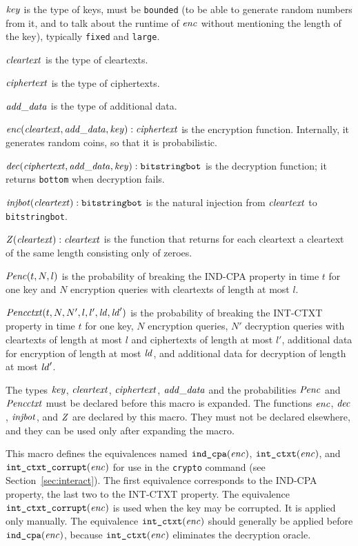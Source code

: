 \documentclass{article}
\begin{document}
\begin{itemize}
   $\mathit{key}$ is the type of keys, must be \texttt{bounded} (to be able to generate random numbers from it, and to talk about the runtime of $\mathit{enc}$ without mentioning the length of the key), typically \texttt{fixed} and \texttt{large}.

   $\mathit{cleartext}$ is the type of cleartexts.

   $\mathit{ciphertext}$ is the type of ciphertexts.

   $\mathit{add\_data}$ is the type of additional data.

   $\mathit{enc}(\mathit{cleartext}, \mathit{add\_data}, \mathit{key}): \mathit{ciphertext}$ is the encryption function. Internally, it generates random coins, so that it is probabilistic.

   $\mathit{dec}(\mathit{ciphertext}, \mathit{add\_data}, \mathit{key}): \texttt{bitstringbot}$ is the
  decryption function; it returns \texttt{bottom} when decryption
  fails.

   $\mathit{injbot}(\mathit{cleartext}): \texttt{bitstringbot}$ is the natural
  injection from $\mathit{cleartext}$ to \texttt{bitstringbot}.

   $\mathit{Z}(\mathit{cleartext}): \mathit{cleartext}$ is the function that
  returns for each cleartext a cleartext of the same length consisting
  only of zeroes.

  $\mathit{Penc}(t, N, l)$ is the probability of breaking the IND-CPA
  property in time $t$ for one key and $N$ encryption queries with
  cleartexts of length at most $l$.

  $\mathit{Pencctxt}(t, N, N', l, l', \mathit{ld}, \mathit{ld}')$ is the probability of
  breaking the INT-CTXT property in time $t$ for one key, $N$
  encryption queries, $N'$ decryption queries with cleartexts of
  length at most $l$ and ciphertexts of length at most $l'$,
  additional data for encryption of length at most $\mathit{ld}$, and
  additional data for decryption of length at most $\mathit{ld}'$.

   The types $\mathit{key}$, $\mathit{cleartext}$,
   $\mathit{ciphertext}$, $\mathit{add\_data}$ and the probabilities $\mathit{Penc}$ and $\mathit{Pencctxt}$ must
   be declared before this macro is expanded. The functions
   $\mathit{enc}$, $\mathit{dec}$, $\mathit{injbot}$, and $\mathit{Z}$ are declared by this
   macro. They must not be declared elsewhere, and they can be used
   only after expanding the macro.

   This macro defines the equivalences named $\texttt{ind\_cpa}(\mathit{enc})$,
   $\texttt{int\_ctxt}(\mathit{enc})$, and $\texttt{int\_ctxt\_corrupt}(\mathit{enc})$ 
   for use in the \texttt{crypto} command 
   (see Section~\ref{sec:interact}). 
   The first equivalence corresponds to the
   IND-CPA property, the last two to the INT-CTXT property.
   The equivalence $\texttt{int\_ctxt\_corrupt}(\mathit{enc})$ is used when the
   key may be corrupted. It is applied only manually.
   The equivalence $\texttt{int\_ctxt}(\mathit{enc})$
   should generally be applied before $\texttt{ind\_cpa}(\mathit{enc})$,
   because $\texttt{int\_ctxt}(\mathit{enc})$ eliminates the decryption oracle.


\end{itemize}
\end{document}
